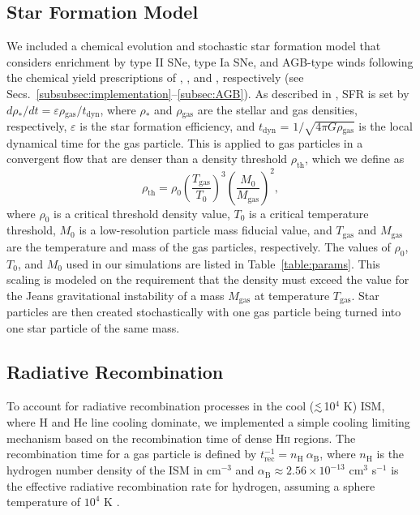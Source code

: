 \documentclass[iop]{emulateapj}
\newcommand{\lapprox }{{\lower0.8ex\hbox{$\buildrel <\over\sim$}}}
\begin{document}
\subsection{Star Formation Model}\label{subsec:sfr}
We included a chemical evolution and stochastic star formation model \citep{Aumer13} that considers enrichment by type II SNe, type Ia SNe, and AGB-type winds following the chemical yield prescriptions of \citet{Woosley95}, \citet{Karakas10}, and \citet{Iwamoto99}, respectively (see Secs.~\ref{subsubsec:implementation}--\ref{subsec:AGB}). As described in \citet{Aumer13}, SFR is set by $d\rho_*/dt = \varepsilon \rho\mathrm{_{gas}}/t\mathrm{_{dyn}}$, where $\rho_*$ and $\rho\mathrm{_{gas}}$ are the stellar and gas densities, respectively, $\varepsilon$ is the star formation efficiency, and $t\mathrm{_{dyn}}$ = $1/\sqrt{4\pi G\rho\mathrm{_{gas}}}$ is the local dynamical time for the gas particle. This is applied to gas particles in a convergent flow that are denser than a density threshold $\rho_{\mathrm{th}}$, which we define as
\begin{equation}\label{rhothresh}
  \rho_{\mathrm{th}} = \rho_0 \left(\frac{T_{\mathrm{gas}}}{T_0}\right)^3 \left(\frac{M_0}{M_{\mathrm{gas}}}\right)^{2},
\end{equation}
where $\rho_0$ is a critical threshold density value, $T_0$ is a critical temperature threshold, $M_0$ is a low-resolution particle mass fiducial value, and $T_{\mathrm{gas}}$ and $M_{\mathrm{gas}}$ are the temperature and mass of the gas particles, respectively. The values of $\rho_0$, $T_0$, and $M_0$ used in our simulations are listed in Table~\ref{table:params}. This scaling is modeled on the requirement that the density must exceed the value for the Jeans gravitational instability of a mass $M_{\mathrm{gas}}$ at temperature $T_{\mathrm{gas}}$. Star particles are then created stochastically with one gas particle being turned into one star particle of the same mass.

\subsection{Radiative Recombination}\label{subsec:recombination}
To account for radiative recombination processes in the cool ($\lapprox$10$^4$ K) ISM, where H and He line cooling dominate, we implemented a simple cooling limiting mechanism based on the recombination time of dense H\textsc{ii} regions. The recombination time for a gas particle is defined by $t_{\mathrm{rec}}^{-1} = n_{\mathrm{H}}\ \alpha_{\mathrm{B}}$, where $n_{\mathrm{H}}$ is the hydrogen number density of the ISM in cm$^{-3}$ and $\alpha_{\mathrm{B}}\approx2.56\times 10^{-13}$ cm$^3$ s$^{-1}$ is the effective radiative recombination rate for hydrogen, assuming a sphere temperature of $10^4$ K \citep{Draine11}.
\end{document}
